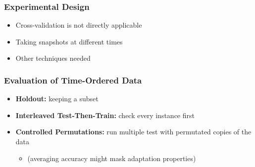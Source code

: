 \begin{frame}
	\frametitle{Experimental Design}
	\begin{itemize}
		\item Cross-validation is not directly applicable
		\item Taking snapshots at different times
		\item Other techniques needed
	\end{itemize}

\end{frame}


\begin{frame}
	\frametitle{Evaluation of Time-Ordered Data}

	\begin{itemize}
		\item \textbf{Holdout:} keeping a subset
		\item \textbf{Interleaved Test-Then-Train:} check every instance first
		\item \textbf{Controlled Permutations:} run multiple test with permutated copies of the data
		\begin{itemize}
			\item (averaging accuracy might mask adaptation properties)
		\end{itemize}
	\end{itemize}

\end{frame}



